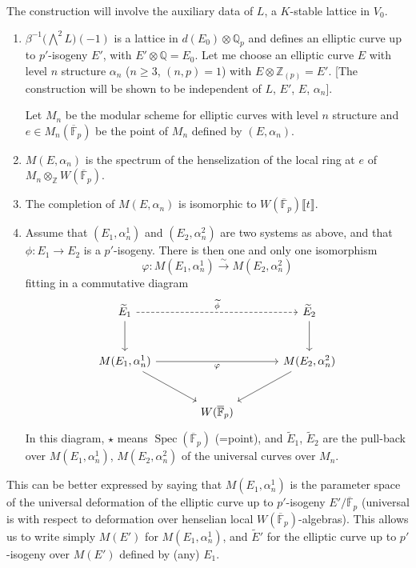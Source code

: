 \documentclass[11pt,a4paper]{article}
\theoremstyle{plain}
\theoremstyle{definition}
\theoremstyle{remark}
\DeclareMathOperator{\Spec}{Spec}
\newcommand{\Q}{\mathbb{Q}}
\newcommand{\Z}{\mathbb{Z}}
\newcommand{\Fpbar}{\overline{\mathbb{F}}_{p}}
\newcommand{\Qp}{\mathbb{Q}_{p}}
\begin{document}
The construction will involve the auxiliary data of $L$, a $K$-stable lattice in $V_{0}$.
\begin{enumerate}[label=(\alph*)]
\item $\beta^{-1}\bigl(\bigwedge^{2} L\bigr)(-1)$ is a lattice in $d(E_{0}) \otimes \Qp$ and defines an elliptic curve up to $p'$-isogeny $E'$, with $E' \otimes \Q = E_{0}$. Let me choose an elliptic curve $E$ with level $n$ structure $\alpha_{n}$ ($n \geq 3$, $(n, p) = 1$) with $E \otimes \Z_{(p)} = E'$. [The construction will be shown to be independent of $L$, $E'$, $E$, $\alpha_{n}$].

Let $M_{n}$ be the modular scheme for elliptic curves with level $n$ structure and $e \in M_{n}(\Fpbar)$ be the point of $M_{n}$ defined by $(E, \alpha_{n})$.

\item $M(E, \alpha_{n})$ is the spectrum of the henselization of the local ring at $e$ of $M_{n} \otimes_{\Z} W(\Fpbar)$.

\item The completion of $M(E, \alpha_{n})$ is isomorphic to $W(\Fpbar)\llbracket t \rrbracket$.

\item Assume that $(E_{1}, \alpha_{n}^{1})$ and $(E_{2}, \alpha_{n}^{2})$ are two systems as above, and that $\phi : E_{1} \to E_{2}$ is a $p'$-isogeny. There is then one and only one isomorphism
\[
\varphi : M(E_{1}, \alpha_{n}^{1}) \xrightarrow{\sim} M(E_{2}, \alpha_{n}^{2})
\]
fitting in a commutative diagram
\[
\begin{tikzcd}[row sep=large, column sep=large]
\widetilde{E}_{1} \arrow[d] \arrow[rr, dashrightarrow, "\widetilde{\phi}"] & & \widetilde{E}_{2} \arrow[d] \\
M(E_{1}, \alpha_{n}^{1}) \arrow[rr, "\varphi"'] \arrow[dr] & & M(E_{2}, \alpha_{n}^{2}) \arrow[dl] \\
& W(\Fpbar) &
\end{tikzcd}
\]
In this diagram, $\star$ means $\Spec(\Fpbar)$ (=point), and $\widetilde{E}_{1}$, $\widetilde{E}_{2}$ are the pull-back over $M(E_{1}, \alpha_{n}^{1})$, $M(E_{2}, \alpha_{n}^{2})$ of the universal curves over $M_{n}$.
\end{enumerate}

This can be better expressed by saying that $M(E_{1}, \alpha_{n}^{1})$ is the parameter space of the universal deformation of the elliptic curve up to $p'$-isogeny $E'/\Fpbar$ (universal is with respect to deformation over henselian local $W(\Fpbar)$-algebras). This allows us to write simply $M(E')$ for $M(E_{1}, \alpha_{n}^{1})$, and $\widetilde{E}'$ for the elliptic curve up to $p'$-isogeny over $M(E')$ defined by (any) $E_{1}$.
\end{document}

